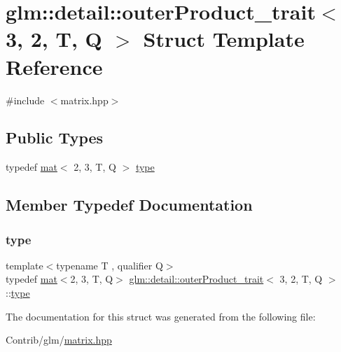 \hypertarget{structglm_1_1detail_1_1outer_product__trait_3_013_00_012_00_01_t_00_01_q_01_4}{}\section{glm\+:\+:detail\+:\+:outer\+Product\+\_\+trait$<$ 3, 2, T, Q $>$ Struct Template Reference}
\label{structglm_1_1detail_1_1outer_product__trait_3_013_00_012_00_01_t_00_01_q_01_4}


{\ttfamily \#include $<$matrix.\+hpp$>$}

\subsection*{Public Types}
\begin{DoxyCompactItemize}
\item 
typedef \mbox{\hyperlink{structglm_1_1mat}{mat}}$<$ 2, 3, T, Q $>$ \mbox{\hyperlink{structglm_1_1detail_1_1outer_product__trait_3_013_00_012_00_01_t_00_01_q_01_4_a9513a6759022bd799945791e82f882dd}{type}}
\end{DoxyCompactItemize}


\subsection{Member Typedef Documentation}
\mbox{\label{structglm_1_1detail_1_1outer_product__trait_3_013_00_012_00_01_t_00_01_q_01_4_a9513a6759022bd799945791e82f882dd}} 
\subsubsection{\texorpdfstring{type}{type}}
{\footnotesize\ttfamily template$<$typename T , qualifier Q$>$ \\
typedef \mbox{\hyperlink{structglm_1_1mat}{mat}}$<$2, 3, T, Q$>$ \mbox{\hyperlink{structglm_1_1detail_1_1outer_product__trait}{glm\+::detail\+::outer\+Product\+\_\+trait}}$<$ 3, 2, T, Q $>$\+::\mbox{\hyperlink{structglm_1_1detail_1_1outer_product__trait_3_013_00_012_00_01_t_00_01_q_01_4_a9513a6759022bd799945791e82f882dd}{type}}}



The documentation for this struct was generated from the following file\+:\begin{DoxyCompactItemize}
\item 
Contrib/glm/\mbox{\hyperlink{matrix_8hpp}{matrix.\+hpp}}\end{DoxyCompactItemize}
